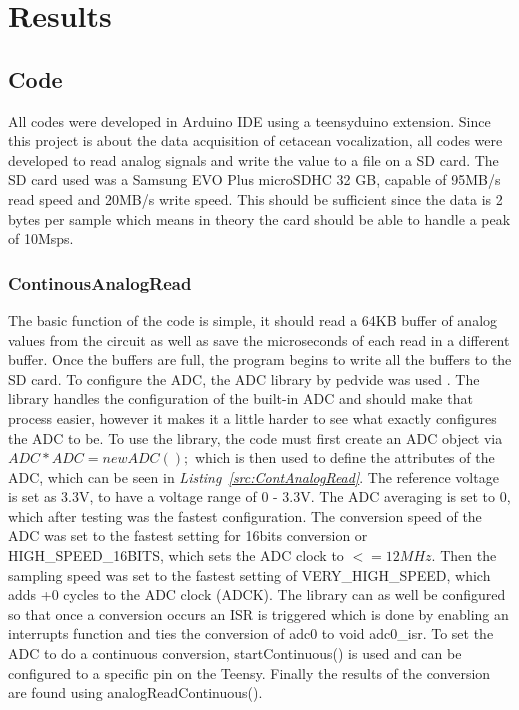 \chapter{Results}



\section{Code}


All codes were developed in Arduino IDE using a teensyduino extension.
Since this project is about the data acquisition of cetacean vocalization, all codes were developed to read analog signals and write the value to a file on a SD card.
The SD card used was a Samsung EVO Plus microSDHC 32 GB, capable of 95MB/s read speed and 20MB/s write speed.
This should be sufficient since the data is 2 bytes per sample which means in theory the card should be able to handle a peak of 10Msps.




\subsection{ContinousAnalogRead}

The basic function of the code is simple, it should read a 64KB buffer of analog values from the circuit as well as save the microseconds of each read in a different buffer.
Once the buffers are full, the program begins to write all the buffers to the SD card.
To configure the ADC, the ADC library by pedvide was used \cite{villanueva_pedvideadc_2021}.
The library handles the configuration of the built-in ADC and should make that process easier, however it makes it a little harder to see what exactly configures the ADC to be.
To use the library, the code must first create an ADC object via 
$ADC *ADC = new ADC();$
which is then used to define the attributes of the ADC, which can be seen in %
\textit{Listing~\ref{src:ContAnalogRead}}. 
The reference voltage is set as 3.3V, to have a voltage range of 0 - 3.3V.
The ADC averaging is set to 0, which after testing was the fastest configuration.
The conversion speed of the ADC was set to the fastest setting for 16bits conversion or HIGH\_SPEED\_16BITS, which sets the ADC clock to $<= 12 MHz$.
Then the sampling speed was set to the fastest setting of VERY\_HIGH\_SPEED, which adds +0 cycles to the ADC clock (ADCK).
The library can as well be configured so that once a conversion occurs an ISR is triggered which is done by enabling an interrupts function and ties the conversion of adc0 to void adc0\_isr.
To set the ADC to do a continuous conversion, startContinuous() is used and can be configured to a specific pin on the Teensy.
Finally the results of the conversion are found using analogReadContinuous().

